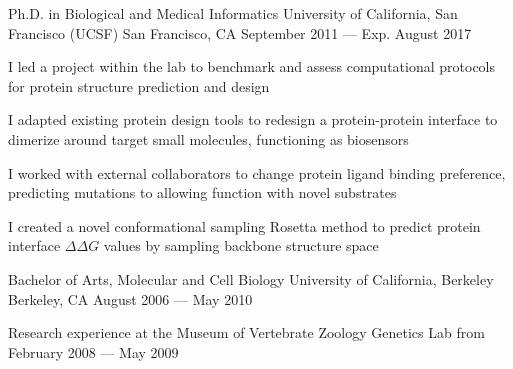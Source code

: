 

\begin{cventries}

  \cventry
  {Ph.D. in Biological and Medical Informatics} %
  {University of California, San Francisco (UCSF)} %
  {San Francisco, CA} %
  {September 2011 --- Exp. August 2017} %
  {
    \begin{cvitems} %
    \item I led a project within the lab to benchmark and assess computational protocols for protein structure prediction and design
    \item I adapted existing protein design tools to redesign a
      protein-protein interface to dimerize around target small molecules, functioning
      as biosensors
    \item I worked with external collaborators to change protein ligand binding preference, predicting mutations to allowing function with novel substrates
    \item I created a novel conformational sampling Rosetta method to predict protein interface $\Delta\Delta G$ values by sampling backbone structure space
    \end{cvitems}
  }

  \cventry
  {Bachelor of Arts, Molecular and Cell Biology} %
  {University of California, Berkeley} %
  {Berkeley, CA} %
  {August 2006 --- May 2010} %
  {
    \begin{cvitems} %
    \item Research experience at the Museum of Vertebrate Zoology Genetics Lab from February 2008 --- May 2009
    \end{cvitems}
  }

\end{cventries}
